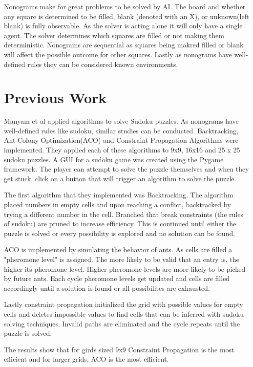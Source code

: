 \documentclass[12pt, a4paper]{article}
\begin{document}
    Nonograms make for great problems to be solved by AI. The board and whether any square is determined to be filled, blank (denoted with an X), or unknown(left blank) is fully observable. As the solver is acting alone it will only have a single agent. The solver determines which squares are filled or not making them deterministic. Nonograms are sequential as squares being makred filled or blank will affect the possible outcome for other squares. Lastly as nonograms have well-defined rules they can be considered known environments.


\section{Previous Work}
    Manyam et al \cite{10863160} applied algorithms to solve Sudoku puzzles. As nonograms have well-defined rules like sudoku, similar studies can be conducted. Backtracking, Ant Colony Optimization(ACO) and Constraint Propagation Algorithms were implemented. They applied each of these algorithms to 9x9, 16x16 and 25 x 25 sudoku puzzles. A GUI for a sudoku game was created using the Pygame framework. The player can attempt to solve the puzzle themselves and when they get stuck, click on a button that will trigger an algorithm to solve the puzzle.

    The first algorithm that they implemented was Backtracking. The algorithm placed numbers in empty cells and upon reaching a conflict, backtracked by trying a different number in the cell. Branched that break constraints (the rules of sudoku) are pruned to increase efficiency. This is continued until either the puzzle is solved or every possibility is explored and no solution can be found.

    ACO is implemented by simulating the behavior of ants. As cells are filled a "pheromone level" is assigned. The more likely to be valid that an entry is, the higher its pheromone level. Higher pheromone levels are more likely to be picked by future ants. Each cycle pheromone levels get updated and cells are filled accordingly until a solution is found or all possibilites are exhausted.

    Lastly constraint propagation initialized the grid with possible values for empty cells and deletes impossible values to find cells that can be inferred with sudoku solving techniques. Invalid paths are eliminated and the cycle repeats until the puzzle is solved.

    The results show that for girds sized 9x9 Constraint Propagation is the most efficient and for larger grids, ACO is the most efficient.
\end{document}
